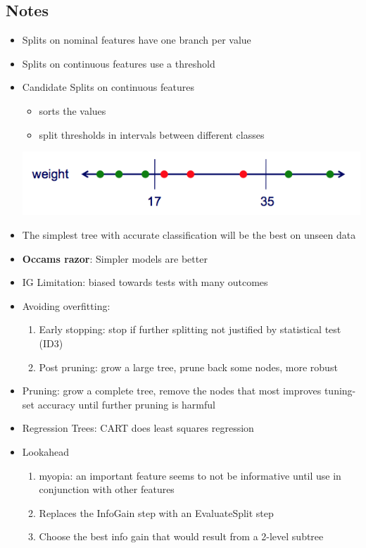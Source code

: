 \documentclass[a4paper]{article}
\begin{document}
\subsection{Notes}
\begin{itemize}
\item Splits on nominal features have one branch per value
\item Splits on continuous features use a threshold
\item Candidate Splits on continuous features
  \begin{itemize}
  \item sorts the values
  \item split thresholds in intervals between different classes
  \end{itemize}
  \includegraphics{contsplit}
\item The simplest tree with accurate classification will be the best
  on unseen data
\item \textbf{Occams razor}: Simpler models are better
\item IG Limitation: biased towards tests with many outcomes
\item Avoiding overfitting:
  \begin{enumerate}
  \item Early stopping: stop if further splitting not justified by
    statistical test (ID3)
  \item Post pruning: grow a large tree, prune back some nodes, more
    robust
  \end{enumerate}
\item Pruning: grow a complete tree, remove the nodes that most
  improves tuning-set accuracy until further pruning is harmful
\item Regression Trees: CART does least squares regression
\item Lookahead
  \begin{enumerate}
  \item myopia: an important feature seems to not be informative
    until use in conjunction with other features
  \item Replaces the InfoGain step with an EvaluateSplit step
  \item Choose the best info gain that would result from a 2-level
    subtree
  \end{enumerate}
  
\end{itemize}
\end{document}
